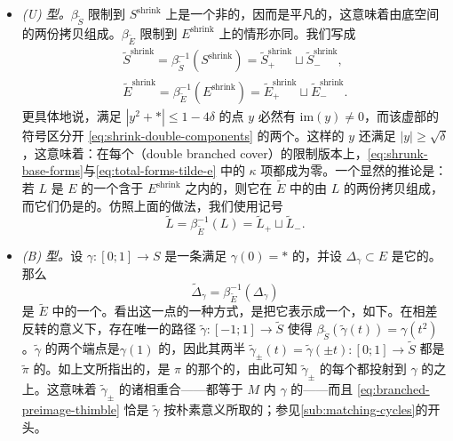 \begin{itemize}
\item \emph{(U) 型。}$\beta_{\widetilde{S}}$ 限制到 $S^{\mathrm{shrink}}$ 上是一个非\trBranchedCover{}的\trCovering，因而是平凡的，这意味着\trTotalSpace{}由底空间的两份拷贝组成。$\beta_{\widetilde{E}}$ 限制到 $E^{\mathrm{shrink}}$ 上的情形亦同。我们写成
\begin{equation}\label{eq:shrink-double-components}
\begin{gathered}
\widetilde{S}^{\mathrm{shrink}}=\beta_{\widetilde{S}}^{-1}(S^{\mathrm{shrink}})=\widetilde{S}^{\mathrm{shrink}}_+\sqcup\widetilde{S}^{\mathrm{shrink}}_-,\\
\widetilde{E}^{\mathrm{shrink}}=\beta_{\widetilde{E}}^{-1}(E^{\mathrm{shrink}})=\widetilde{E}^{\mathrm{shrink}}_+\sqcup\widetilde{E}^{\mathrm{shrink}}_-.
\end{gathered}
\end{equation}
更具体地说，满足 $|y^2+*|\le 1-4\delta$ 的点 $y$ 必然有 $\mathrm{im}(y)\neq 0$，而该虚部的符号区分开 \eqref{eq:shrink-double-components} 的两个\trConnectedComponent。这样的 $y$ 还满足 $|y|\ge\sqrt{\delta}$，这意味着：在每个\textbf{\trDoubleBranchedCover}（double branched cover）的限制版本上，\eqref{eq:shrunk-base-forms}与\eqref{eq:total-forms-tilde-e} 中的 $\kappa$ 项都成为零。一个显然的推论是：若 $L$ 是 $E$ 的一个含于 $E^{\mathrm{shrink}}$ 之内的\trExact\trLagrange\trSubmanifold，则它在 $\widetilde{E}$ 中的\trPreimage{}由 $L$ 的两份拷贝组成，而它们仍是\trExact{}的\trLagrange\trSubmanifold。仿照上面的做法，我们使用记号
\begin{equation*}
\widetilde{L}=\beta_{\widetilde{E}}^{-1}(L)=\widetilde{L}_+\sqcup\widetilde{L}_-.
\end{equation*}
\item \emph{(B) 型。}设 $\gamma\colon[0;1]\to S$ 是一条满足 $\gamma(0)=*$ 的\trVanishingPath，并设 $\Delta_\gamma\subset E$ 是它的\trLefschetzThimble。那么
\begin{equation}\label{eq:branched-preimage-thimble}
\widetilde{\Delta}_\gamma=\beta_{\widetilde{E}}^{-1}(\Delta_\gamma)
\end{equation}
是 $\widetilde{E}$ 中的一个\trSmooth\trLagrange\trSphere。看出这一点的一种方式，是把它表示成一个\trMatchingCycle，如下。在相差\trOrientation{}反转的意义下，存在唯一的\trSmooth{}路径 $\tilde{\gamma}\colon[-1;1]\to\widetilde{S}$ 使得 $\beta_{\widetilde{S}}(\tilde{\gamma}(t))=\gamma(t^2)$。$\tilde{\gamma}$ 的两个端点是\trCriticalValue{}$\gamma(1)$ 的\trPreimage，因此其两半 $\tilde{\gamma}_\pm(t)=\tilde{\gamma}(\pm t)\colon[0;1]\to\widetilde{S}$ 都是 $\tilde{\pi}$ 的\trVanishingPath。如上文所指出的，\trSymplectic\trConnection{}是 $\pi$ 的那个的\trPullback，由此可知 $\tilde{\gamma}_\pm$ 的每个\trLefschetzThimble{}都投射到 $\gamma$ 的\trLefschetzThimble{}之上。这意味着 $\tilde{\gamma}_\pm$ 的诸\trVanishingCycle{}相重合——都等于 $M$ 内 $\gamma$ 的\trVanishingCycle——而且 \eqref{eq:branched-preimage-thimble} 恰是 $\tilde{\gamma}$ 按朴素意义所取的\trMatchingCycle；参见\cref{sub:matching-cycles}的开头。
\end{itemize}
